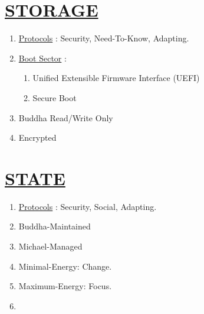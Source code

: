 \documentclass[11pt]{article}
\begin{document}
\section*{\ul{STORAGE}}
\begin{enumerate}
	\item[] \ul{Protocols} : Security, Need-To-Know, Adapting.
	
	\item[] \ul{Boot Sector} :
	\begin{enumerate}
		\item[] Unified Extensible Firmware Interface (UEFI)
		\item[] Secure Boot
	\end{enumerate}
	
	\item[] Buddha Read/Write Only
	\item[] Encrypted

\end{enumerate}


\section*{\ul{STATE}}
\begin{enumerate}
	\item[] \ul{Protocols} : Security, Social, Adapting.
	
	\item[] Buddha-Maintained
	\item[] Michael-Managed
	\item[] Minimal-Energy: Change.
	\item[] Maximum-Energy: Focus.
	\item[] 
	
\end{enumerate}
\end{document}

